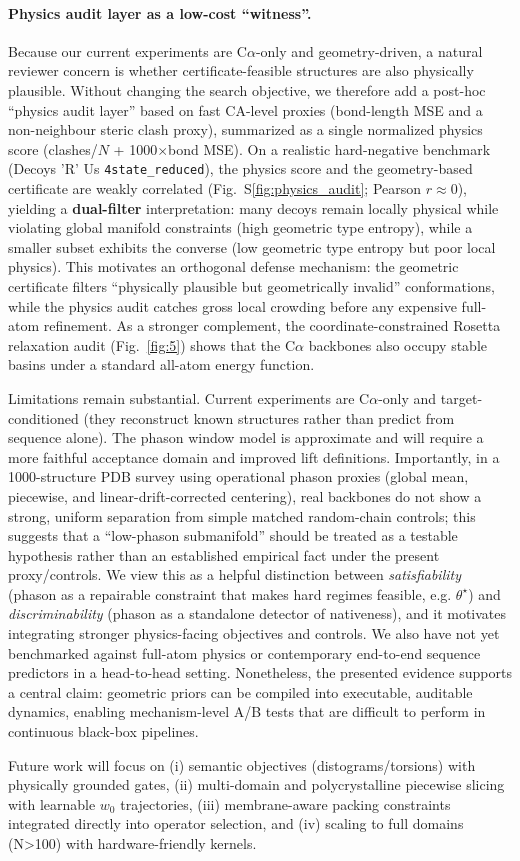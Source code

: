 \paragraph{Physics audit layer as a low-cost ``witness''.}
Because our current experiments are C$\alpha$-only and geometry-driven, a natural reviewer concern is whether certificate-feasible structures are also physically plausible. Without changing the search objective, we therefore add a post-hoc ``physics audit layer'' based on fast CA-level proxies (bond-length MSE and a non-neighbour steric clash proxy), summarized as a single normalized physics score (clashes/$N$ + 1000$\times$bond MSE). On a realistic hard-negative benchmark (Decoys 'R' Us \texttt{4state\_reduced}), the physics score and the geometry-based certificate are weakly correlated (Fig.~S\ref{fig:physics_audit}; Pearson $r\approx 0$), yielding a \textbf{dual-filter} interpretation: many decoys remain locally physical while violating global manifold constraints (high geometric type entropy), while a smaller subset exhibits the converse (low geometric type entropy but poor local physics). This motivates an orthogonal defense mechanism: the geometric certificate filters ``physically plausible but geometrically invalid'' conformations, while the physics audit catches gross local crowding before any expensive full-atom refinement. As a stronger complement, the coordinate-constrained Rosetta relaxation audit (Fig.~\ref{fig:5}) shows that the C$\alpha$ backbones also occupy stable basins under a standard all-atom energy function.


Limitations remain substantial. Current experiments are C$\alpha$-only and target-conditioned (they reconstruct known structures rather than predict from sequence alone). The phason window model is approximate and will require a more faithful acceptance domain and improved lift definitions. Importantly, in a 1000-structure PDB survey using operational phason proxies (global mean, piecewise, and linear-drift-corrected centering), real backbones do not show a strong, uniform separation from simple matched random-chain controls; this suggests that a ``low-phason submanifold'' should be treated as a testable hypothesis rather than an established empirical fact under the present proxy/controls. We view this as a helpful distinction between \emph{satisfiability} (phason as a repairable constraint that makes hard regimes feasible, e.g. $\theta^\star$) and \emph{discriminability} (phason as a standalone detector of nativeness), and it motivates integrating stronger physics-facing objectives and controls. We also have not yet benchmarked against full-atom physics or contemporary end-to-end sequence predictors in a head-to-head setting. Nonetheless, the presented evidence supports a central claim: geometric priors can be compiled into executable, auditable dynamics, enabling mechanism-level A/B tests that are difficult to perform in continuous black-box pipelines.

Future work will focus on (i) semantic objectives (distograms/torsions) with physically grounded gates, (ii) multi-domain and polycrystalline piecewise slicing with learnable $w_0$ trajectories, (iii) membrane-aware packing constraints integrated directly into operator selection, and (iv) scaling to full domains (N>100) with hardware-friendly kernels.
